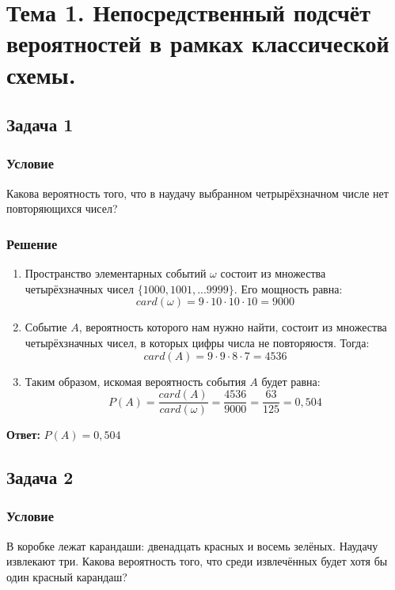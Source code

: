 \documentclass[14pt]{article}
\begin{document}
    \section*{Тема 1.
    Непосредственный подсчёт вероятностей в рамках классической схемы.}

    \subsection*{Задача 1}
    \subsubsection*{Условие}

    Какова вероятность того, что в наудачу выбранном четрырёхзначном числе нет повторяющихся чисел?

    \subsubsection*{Решение}

    \begin{enumerate}[wide, labelwidth=!, labelindent=0pt]
        \item Пространство элементарных событий $\omega$ состоит из множества четырёхзначных чисел $\{1000, 1001, ... 9999\}$.
        Его мощность равна:
        \[card (\omega)= 9 \cdot 10 \cdot 10 \cdot 10 = 9000 \]
        \item Событие $A$, вероятность которого нам нужно найти, состоит из множества четырёхзначных чисел, в которых цифры числа не повторяюстя.
        Тогда:
        \[card (A) = 9 \cdot 9 \cdot 8 \cdot 7 = 4536\]
        \item Таким образом, искомая вероятность события $A$ будет равна:
        \[P(A) = \frac{card(A)}{card(\omega)} = \frac{4536}{9000} = \frac{63}{125} = 0,504\]
    \end{enumerate}

    \hspace{290pt}\textbf{Ответ:} $P(A) = 0,504$

    \subsection*{Задача 2}
    \subsubsection*{Условие}

    В коробке лежат карандаши: двенадцать красных и восемь зелёных. Наудачу извлекают три.
    Какова вероятность того, что среди извлечённых будет хотя бы один красный карандаш?
\end{document}
